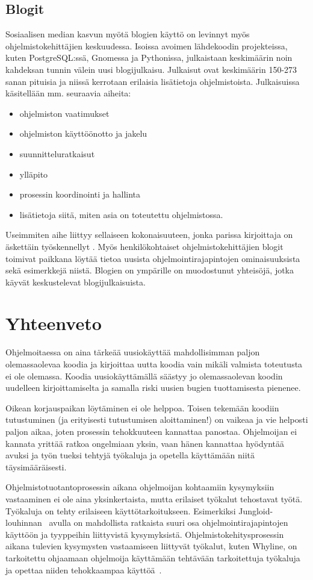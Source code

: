 \documentclass[finnish]{tktltiki2}
\theoremstyle{definition}
\theoremstyle{remark}
\begin{document}
\subsection{Blogit}
Sosiaalisen median kasvun myötä blogien käyttö on levinnyt myös ohjelmistokehittäjien keskuudessa. Isoissa avoimen lähdekoodin projekteissa, kuten PostgreSQL:ssä, Gnomessa ja Pythonissa, julkaistaan keskimäärin noin kahdeksan tunnin välein uusi blogijulkaisu. Julkaisut ovat keskimäärin 150-273 sanan pituisia ja niissä kerrotaan erilaisia lisätietoja ohjelmistoista. Julkaisuissa käsitellään mm. seuraavia aiheita:
\begin{itemize}
  \item ohjelmiston vaatimukset
  \item ohjelmiston käyttöönotto ja jakelu
  \item suunnitteluratkaisut
  \item ylläpito
  \item prosessin koordinointi ja hallinta
\item lisätietoja siitä, miten asia on toteutettu ohjelmistossa.
\end{itemize}

Useimmiten aihe liittyy sellaiseen kokonaisuuteen, jonka parissa kirjoittaja on äskettäin työskennellyt \cite{how-dev-blog}.
Myös henkilökohtaiset ohjelmistokehittäjien blogit toimivat paikkana löytää tietoa uusista ohjelmointirajapintojen ominaisuuksista sekä esimerkkejä niistä. Blogien on ympärille on muodostunut yhteisöjä, jotka käyvät keskustelevat blogijulkaisuista.

\section{Yhteenveto}
Ohjelmoitaessa on aina tärkeää uusiokäyttää mahdollisimman paljon olemassaolevaa koodia ja kirjoittaa uutta koodia vain mikäli valmista toteutusta ei ole olemassa. Koodia uusiokäyttämällä säästyy jo olemassaolevan koodin uudelleen kirjoittamiselta ja samalla riski uusien bugien tuottamisesta pienenee.

Oikean korjauspaikan löytäminen ei ole helppoa. Toisen tekemään koodiin tutustuminen (ja erityisesti tutustumisen aloittaminen!) on vaikeaa ja vie helposti paljon aikaa, joten prosessin tehokkuuteen kannattaa panostaa. Ohjelmoijan ei kannata yrittää ratkoa ongelmiaan yksin, vaan hänen kannattaa hyödyntää avuksi ja työn tueksi tehtyjä työkaluja ja opetella käyttämään niitä täysimääräisesti.

Ohjelmistotuotantoprosessin aikana ohjelmoijan kohtaamiin kysymyksiin vastaaminen ei ole aina yksinkertaista, mutta erilaiset työkalut tehostavat työtä. Työkaluja on tehty erilaiseen käyttötarkoitukseen. Esimerkiksi Jungloid-louhinnan~\cite{jungloid-mining} avulla on mahdollista ratkaista suuri osa ohjelmointirajapintojen käyttöön ja tyyppeihin liittyvistä kysymyksistä. Ohjelmistokehitysprosessin aikana tulevien kysymysten vastaamiseen liittyvät työkalut, kuten Whyline, on tarkoitettu ohjaamaan ohjelmoija käyttämään tehtävään tarkoitettuja työkaluja ja opettaa niiden tehokkaampaa käyttöä~\cite{whyline}.
\end{document}
